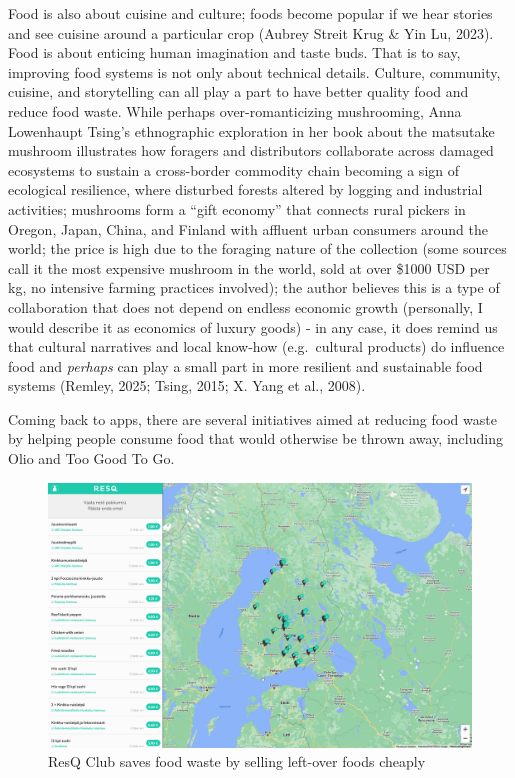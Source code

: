 \documentclass[
  12pt,
  letterpaper,
  DIV=11,
  numbers=noendperiod]{scrartcl}
\begin{document}
Food is also about cuisine and culture; foods become popular if we hear
stories and see cuisine around a particular crop (Aubrey Streit Krug \&
Yin Lu, 2023). Food is about enticing human imagination and taste buds.
That is to say, improving food systems is not only about technical
details. Culture, community, cuisine, and storytelling can all play a
part to have better quality food and reduce food waste. While perhaps
over-romanticizing mushrooming, Anna Lowenhaupt Tsing's ethnographic
exploration in her book about the matsutake mushroom illustrates how
foragers and distributors collaborate across damaged ecosystems to
sustain a cross-border commodity chain becoming a sign of ecological
resilience, where disturbed forests altered by logging and industrial
activities; mushrooms form a ``gift economy'' that connects rural
pickers in Oregon, Japan, China, and Finland with affluent urban
consumers around the world; the price is high due to the foraging nature
of the collection (some sources call it the most expensive mushroom in
the world, sold at over \$1000 USD per kg, no intensive farming
practices involved); the author believes this is a type of collaboration
that does not depend on endless economic growth (personally, I would
describe it as economics of luxury goods) - in any case, it does remind
us that cultural narratives and local know-how (e.g.~cultural products)
do influence food and \emph{perhaps} can play a small part in more
resilient and sustainable food systems (Remley, 2025; Tsing, 2015; X.
Yang et al., 2008).

Coming back to apps, there are several initiatives aimed at reducing
food waste by helping people consume food that would otherwise be thrown
away, including Olio and Too Good To Go.

\begin{figure}[H]

{\centering \includegraphics[width=1\linewidth,height=\textheight,keepaspectratio]{./images/design/resq-club.png}

}

\caption{ResQ Club saves food waste by selling left-over foods cheaply}

\end{figure}%
\end{document}
